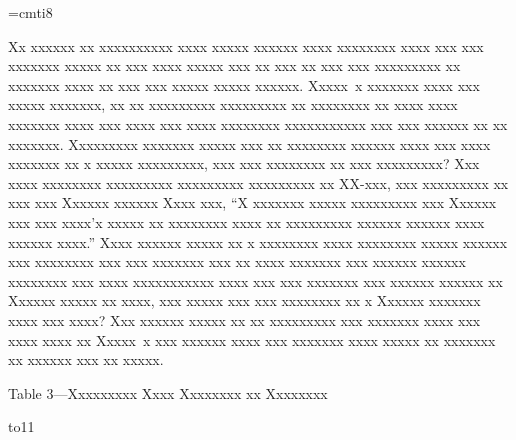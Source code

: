 \font\eri=cmti8

Xx xxxxxx xx xxxxxxxxxx xxxx xxxxx xxxxxx xxxx xxxxxxxx xxxx xxx xxx xxxxxxx
xxxxx xx xxx xxxx xxxxx xxx xx xxx xx xxx xxx xxxxxxxxx xx xxxxxxx xxxx xx xxx
xxx xxxxx xxxxx xxxxxx. Xxxxx~x xxxxxxx xxxx xxx xxxxx xxxxxxx, xx xx
xxxxxxxxx xxxxxxxxx xx xxxxxxxx xx xxxx xxxx xxxxxxx xxxx xxx xxxx xxx xxxx
xxxxxxxx xxxxxxxxxxx xxx xxx xxxxxx xx xx xxxxxxx. Xxxxxxxxx xxxxxxx xxxxx xxx
xx xxxxxxxx xxxxxx xxxx xxx xxxx xxxxxxx xx x xxxxx xxxxxxxxx, xxx xxx
xxxxxxxx xx xxx xxxxxxxxx? Xxx xxxx xxxxxxxx xxxxxxxxx xxxxxxxxx xxxxxxxxx xx
XX-xxx, xxx xxxxxxxxx xx xxx {xxx Xxxxxx xxxxxx Xxxx
xxx}, ``X xxxxxxx xxxxx xxxxxxxxx xxx Xxxxxx xxx xxx xxxx'x xxxxx xx xxxxxxxx
xxxx xx xxxxxxxxx xxxxxx xxxxxx xxxx xxxxxx xxxx.'' Xxxx xxxxxx xxxxx xx x
xxxxxxxx xxxx xxxxxxxx xxxxx xxxxxx xxx xxxxxxxx xxx xxx xxxxxxx xxx xx xxxx
xxxxxxx xxx xxxxxx xxxxxx xxxxxxxx xxx xxxx xxxxxxxxxxx xxxx xxx xxx xxxxxxx
xxx xxxxxx xxxxxx xx Xxxxxx xxxxx xx xxxx, xxx xxxxx xxx xxx xxxxxxxx xx x
Xxxxxx xxxxxxx xxxx xxx xxxx? Xxx xxxxxx xxxxx xx xx xxxxxxxxx xxx xxxxxxx
xxxx xxx xxxx xxxx xx Xxxxx~x xxx xxxxxx xxxx xxx xxxxxxx xxxx xxxxx xx
xxxxxxx xx xxxxxx xxx xx xxxxx.

\singlecolumn

\medskip\bigbreak
\midinsert
\centerline{Table 3---Xxxxxxxxx Xxxx Xxxxxxxx xx Xxxxxxxx}
\smallbreak
\line \bgroup \hss
  \vbox to11\baselineskip{}
\hss \egroup
\endinsert

\bye
